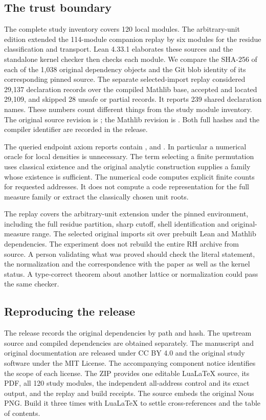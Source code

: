 \documentclass[12pt,letterpaper]{article}
\newcommand{\code}[1]{\texttt{\detokenize{#1}}}
\begin{document}
\subsection{The trust boundary}
The complete study inventory covers 120 local modules. The arbitrary-unit edition extended the 114-module companion replay by six modules for the residue classification and transport. Lean 4.33.1 elaborates these sources and the standalone kernel checker then checks each module. We compare the SHA-256 of each of the 1,038 original dependency objects and the Git blob identity of its corresponding pinned source. The separate selected-import replay considered 29,137 declaration records over the compiled Mathlib base, accepted and located 29,109, and skipped 28 unsafe or partial records. It reports 239 shared declaration names. These numbers count different things from the study module inventory. The original source revision is \code{40e56bab}; the Mathlib revision is \code{0df444a3}. Both full hashes and the compiler identifier are recorded in the release.

The queried endpoint axiom reports contain \code{propext}, \code{Classical.choice} and \code{Quot.sound}. In particular a numerical oracle for local densities is unnecessary. The term selecting a finite permutation uses classical existence and the original analytic construction supplies a family whose existence is sufficient. The numerical code computes explicit finite counts for requested addresses. It does not compute a code representation for the full measure family or extract the classically chosen unit roots.

The replay covers the arbitrary-unit extension under the pinned environment, including the full residue partition, sharp cutoff, shell identification and original-measure range. The selected original imports sit over prebuilt Lean and Mathlib dependencies. The experiment does not rebuild the entire RH archive from source. A person validating what was proved should check the literal statement, the normalization and the correspondence with the paper as well as the kernel status. A type-correct theorem about another lattice or normalization could pass the same checker.

\subsection{Reproducing the release}
The release records the original dependencies by path and hash. The upstream source and compiled dependencies are obtained separately. The manuscript and original documentation are released under CC BY 4.0 and the original study software under the MIT License. The accompanying component notice identifies the scope of each license.
The ZIP provides one editable LuaLaTeX source, its PDF, all 120 study modules, the independent all-address control and its exact output, and the replay and build receipts. The source embeds the original Nous PNG. Build it three times with LuaLaTeX to settle cross-references and the table of contents.
\end{document}
